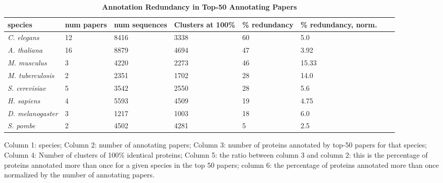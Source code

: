 \documentclass[12pt]{article}
\begin{document}
\begin{table}[!ht]
\caption{
\bf{Annotation Redundancy in Top-50 Annotating Papers}}
\begin{tabular}{|p{3cm}|p{1.5cm}|p{2cm}|p{2cm}|p{2cm}|p{2cm}|p{2cm}|p{2cm}|}
\hline
\textbf{species} & \textbf{num papers} &\textbf{num sequences} & \textbf{Clusters at 100\%} & 
\textbf{\% redundancy} & \textbf{\% redundancy, norm.}  
\\ \hline
\textit{C. elegans}  & 12 & 8416 & 3338 & 60 & 5.0 %
\\ \hline
\textit{A. thaliana}  & 16 &  8879 & 4694 & 47 & 3.92 %
\\ \hline
\textit{M. musculus}  & 3 &  4220 & 2273 & 46 & 15.33 %
\\ \hline
\textit{M. tuberculosis}  & 2 & 2351& 1702& 28 & 14.0 %
\\ \hline
\textit{S. cerevisiae}  & 5 & 3542 & 2550 & 28 & 5.6 %
\\ \hline
\textit{H. sapiens}  & 4 & 5593 & 4509 & 19 & 4.75 %
\\ \hline
\textit{D. melanogaster} & 3  & 1217 & 1003 & 18 & 6.0 %
\\ \hline
\textit{S. pombe}  & 2 & 4502 & 4281 & 5 & 2.5 %
\\ \hline
\end{tabular}
\begin{flushleft} 
Column 1: species; Column 2: number of annotating papers; Column 3: number of proteins annotated by
top-50 papers for that species; Column 4: Number of clusters of 100\% identical proteins; Column 5:
the ratio between column 3 and column 2: this is the percentage of proteins annotated more than once for
a given species in the top 50 papers; column 6: the percentage of proteins annotated more than once
normalized by the number of annotating papers.
\end{flushleft}
\label{tab:dreamcatcher1}
\end{table}
\end{document}
